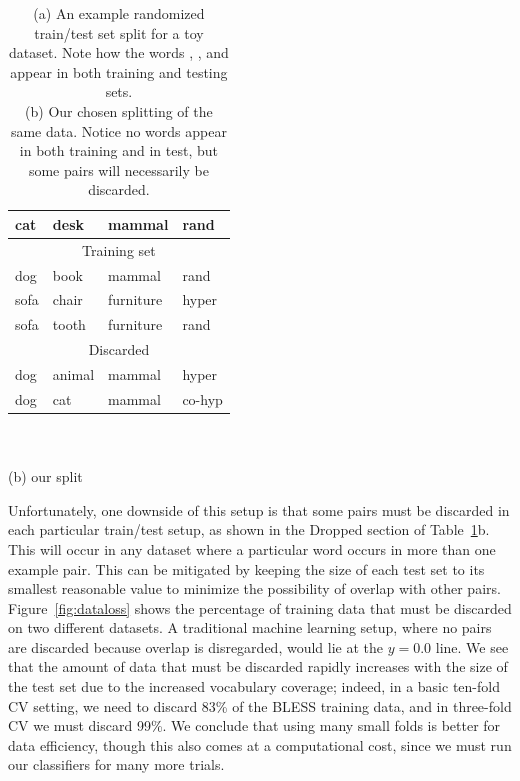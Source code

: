 \begin{table}
\begin{minipage}[b]{6cm}
\begin{tabular}{|llll|}
    cat       &  desk     &  mammal        & rand        \\
    \hline
    \hline
    \multicolumn{4}{|c|}{Training set}\\
    \hline
    dog       &  book     &  mammal        & rand        \\
    sofa      &  chair    &  furniture     & hyper       \\
    sofa      &  tooth    &  furniture     & rand        \\
    \hline
    \hline
    \multicolumn{4}{|c|}{Discarded}\\
    \hline
    dog       &  animal   &  mammal        & hyper       \\
    dog       &  cat      &  mammal        & co-hyp      \\
    \hline
  \end{tabular}\\~\\{\small (b) our split}
  \end{minipage}
  \caption{(a) An example randomized train/test set split for a toy dataset.
  Note how the words , , and  appear in both
  training and testing sets.\\(b) Our chosen splitting of the same data. Notice
  no words appear in both training and in test, but some pairs will necessarily
  be discarded.}
\label{tab:splits}
\end{table}

Unfortunately, one downside of this setup is that some pairs must be discarded
in each particular train/test setup, as shown in the Dropped section of
Table~\ref{tab:splits}b. This will occur in any dataset where a particular word
occurs in more than one example pair.  This can be mitigated by keeping the
size of each test set to its smallest reasonable value to minimize the
possibility of overlap with other pairs. Figure~\ref{fig:dataloss} shows the
percentage of training data that must be discarded on two different datasets.
A traditional machine learning setup, where no pairs are discarded because
overlap is disregarded, would lie at the $y = 0.0$ line. We see that the
amount of data that must be discarded rapidly increases with the size of
the test set due to the increased vocabulary coverage; indeed, in a basic
ten-fold CV setting, we need to discard 83\% of the BLESS training data, and
in three-fold CV we must discard 99\%. We conclude that using many small
folds is better for data efficiency, though this also comes at a computational
cost, since we must run our classifiers for many more trials.

